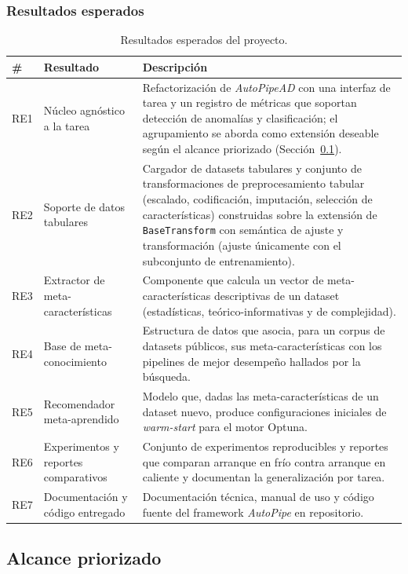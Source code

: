\documentclass[12pt,letterpaper]{article}
\begin{document}
\subsubsection{Resultados esperados}

\begin{table}[H]
\centering
\caption{Resultados esperados del proyecto.}
\small
\begin{tabularx}{\textwidth}{l L{4.5cm} Y}
\toprule
{} \textbf{\#} & \textbf{Resultado} & \textbf{Descripción} \\
\midrule
RE1 & Núcleo agnóstico a la tarea & Refactorización de \textit{AutoPipeAD} con una interfaz de tarea y un registro de métricas que soportan detección de anomalías y clasificación; el agrupamiento se aborda como extensión deseable según el alcance priorizado (Sección~\ref{subsec:alcance}). \\
RE2 & Soporte de datos tabulares & Cargador de datasets tabulares y conjunto de transformaciones de preprocesamiento tabular (escalado, codificación, imputación, selección de características) construidas sobre la extensión de \texttt{BaseTransform} con semántica de ajuste y transformación (ajuste únicamente con el subconjunto de entrenamiento). \\
RE3 & Extractor de meta-características & Componente que calcula un vector de meta-características descriptivas de un dataset (estadísticas, teórico-informativas y de complejidad). \\
RE4 & Base de meta-conocimiento & Estructura de datos que asocia, para un corpus de datasets públicos, sus meta-características con los pipelines de mejor desempeño hallados por la búsqueda. \\
RE5 & Recomendador meta-aprendido & Modelo que, dadas las meta-características de un dataset nuevo, produce configuraciones iniciales de \textit{warm-start} para el motor Optuna. \\
RE6 & Experimentos y reportes comparativos & Conjunto de experimentos reproducibles y reportes que comparan arranque en frío contra arranque en caliente y documentan la generalización por tarea. \\
RE7 & Documentación y código entregado & Documentación técnica, manual de uso y código fuente del framework \textit{AutoPipe} en repositorio. \\
\bottomrule
\end{tabularx}
\end{table}

\subsection{Alcance priorizado}
\label{subsec:alcance}
\end{document}
